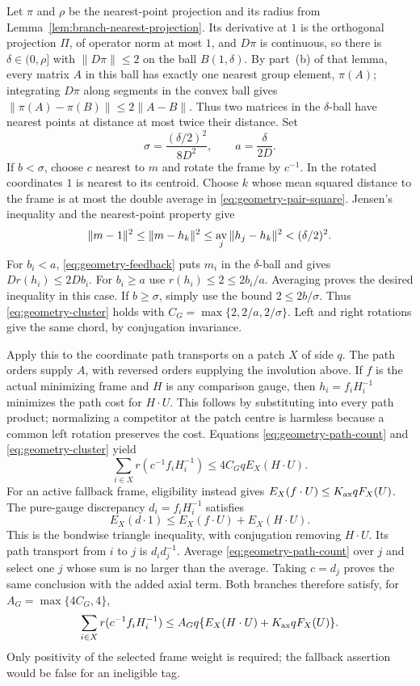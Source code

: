 Let $\pi$ and $\rho$ be the nearest-point projection and its radius
from Lemma~\ref{lem:branch-nearest-projection}. Its derivative at $1$
is the orthogonal projection $\Pi$, of operator norm at most $1$, and
$D\pi$ is continuous, so there is $\delta\in(0,\rho]$ with
$\|D\pi\|\le2$ on the ball $B(1,\delta)$. By part~(b) of that lemma,
every matrix $A$ in this ball has exactly one nearest group element,
$\pi(A)$; integrating $D\pi$ along segments in the convex ball gives
$\|\pi(A)-\pi(B)\|\le2\|A-B\|$. Thus two matrices in the $\delta$-ball
have nearest points at distance at most twice their distance. Set
\[
 \sigma=\frac{(\delta/2)^2}{8D^2},\qquad a=\frac{\delta}{2D}.
\]
If $b<\sigma$, choose $c$ nearest to $m$ and rotate the frame by
$c^{-1}$. In the rotated coordinates $1$ is nearest to its centroid.
Choose $k$ whose mean squared distance to the frame is at most the
double average in \eqref{eq:geometry-pair-square}. Jensen's inequality
and the nearest-point property give
\[
 \|m-1\|^2\le\|m-h_k\|^2
 \le\mathop{\rm av}_j\|h_j-h_k\|^2< (\delta/2)^2.
\]
For $b_i<a$, \eqref{eq:geometry-feedback} puts $m_i$ in the
$\delta$-ball and gives $Dr(h_i)\le2Db_i$. For $b_i\ge a$ use
$r(h_i)\le2\le2b_i/a$. Averaging proves the desired inequality in
this case. If $b\ge\sigma$, simply use the bound $2\le2b/\sigma$.
Thus \eqref{eq:geometry-cluster} holds with
$C_G=\max\{2,2/a,2/\sigma\}$. Left and right rotations give the same
chord, by conjugation invariance.

Apply this to the coordinate path transports on a patch $X$ of side
$q$. The path orders supply $A$, with reversed orders supplying the
involution above. If $f$ is the actual minimizing frame and $H$ is any
comparison gauge, then $h_i=f_iH_i^{-1}$ minimizes the path cost for
$H\cdot U$. This follows by substituting into every path product;
normalizing a competitor at the patch centre is harmless because a
common left rotation preserves the cost. Equations
\eqref{eq:geometry-path-count} and \eqref{eq:geometry-cluster} yield
\[
 \sum_{i\in X}r(c^{-1}f_iH_i^{-1})\le4C_Gq E_X(H\cdot U).
\]
For an active fallback frame, eligibility instead gives
$E_X(f\cdot U)\le K_{\rm ax}qF_X(U)$. The pure-gauge discrepancy
$d_i=f_iH_i^{-1}$ satisfies
\[
 E_X(d\cdot1)\le E_X(f\cdot U)+E_X(H\cdot U).
\]
This is the bondwise triangle inequality, with conjugation removing
$H\cdot U$. Its path transport from $i$ to $j$ is $d_id_j^{-1}$.
Average \eqref{eq:geometry-path-count} over $j$ and select one $j$
whose sum is no larger than the average. Taking $c=d_j$ proves the
same conclusion with the added axial term. Both branches therefore
satisfy, for $A_G=\max\{4C_G,4\}$,
\begin{equation}\label{eq:geometry-frame}
 \sum_{i\in X}r(c^{-1}f_iH_i^{-1})
 \le A_G q\{E_X(H\cdot U)+K_{\rm ax}qF_X(U)\}.
\end{equation}
Only positivity of the selected frame weight is required; the
fallback assertion would be false for an ineligible tag.

